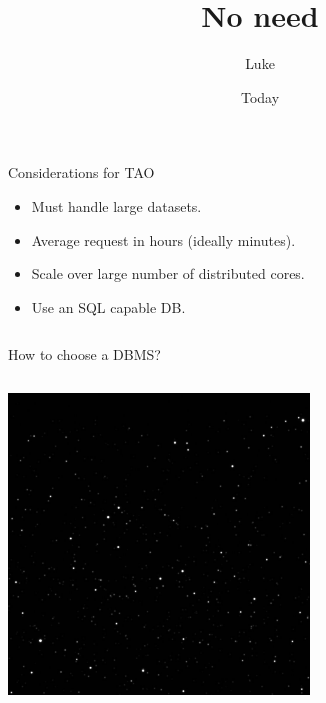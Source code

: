 \documentclass[aspectratio=169]{beamer}
\title[Whats this]{No need}
\author{Luke}
\institute{Somewhere}
\date{Today}
\begin{document}
\begin{frame}[plain]{}
  \begin{exampleblock}{}
    {\LARGE Considerations for TAO}
  \end{exampleblock}
  \Large
  \begin{itemize}
    \item Must handle large datasets.
    \item Average request in hours (ideally minutes).
    \item Scale over large number of distributed cores.
    \item Use an SQL capable DB.
  \end{itemize}
  \begin{columns}[c]
    \column{3cm}
    \column{4cm}
    \begin{exampleblock}{}
      How to choose a DBMS?
    \end{exampleblock}
  \end{columns}
\end{frame}





\begin{frame}[plain]
  \begin{center}
    \includegraphics[width=8cm]{sky.jpg}
  \end{center}
\end{frame}

\end{document}
